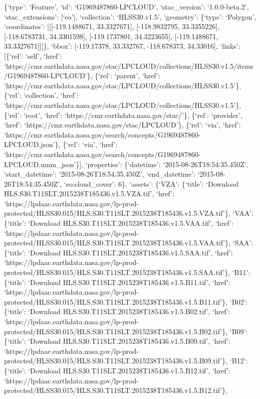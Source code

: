 \documentclass[
  letterpaper,
]{scrartcl}
\begin{document}
\{`type': `Feature', `id': `G1969487860-LPCLOUD', `stac\_version':
`1.0.0-beta.2', `stac\_extensions': {[}`eo'{]}, `collection':
`HLSS30.v1.5', `geometry': \{`type': `Polygon', `coordinates':
{[}{[}{[}-119.1488671, 33.3327671{]}, {[}-118.9832795, 33.3355226{]},
{[}-118.6783731, 34.3301598{]}, {[}-119.1737801, 34.3223655{]},
{[}-119.1488671, 33.3327671{]}{]}{]}\}, `bbox': {[}-119.17378,
33.332767, -118.678373, 34.33016{]}, `links': {[}\{`rel': `self',
`href':
`https://cmr.earthdata.nasa.gov/stac/LPCLOUD/collections/HLSS30.v1.5/items/G1969487860-LPCLOUD'\},
\{`rel': `parent', `href':
`https://cmr.earthdata.nasa.gov/stac/LPCLOUD/collections/HLSS30.v1.5'\},
\{`rel': `collection', `href':
`https://cmr.earthdata.nasa.gov/stac/LPCLOUD/collections/HLSS30.v1.5'\},
\{`rel': `root', `href': `https://cmr.earthdata.nasa.gov/stac/'\},
\{`rel': `provider', `href':
`https://cmr.earthdata.nasa.gov/stac/LPCLOUD'\}, \{`rel': `via', `href':
`https://cmr.earthdata.nasa.gov/search/concepts/G1969487860-LPCLOUD.json'\},
\{`rel': `via', `href':
`https://cmr.earthdata.nasa.gov/search/concepts/G1969487860-LPCLOUD.umm\_json'\}{]},
`properties': \{`datetime': `2015-08-26T18:54:35.450Z',
`start\_datetime': `2015-08-26T18:54:35.450Z', `end\_datetime':
`2015-08-26T18:54:35.450Z', `eo:cloud\_cover': 6\}, `assets': \{`VZA':
\{`title': `Download HLS.S30.T11SLT.2015238T185436.v1.5.VZA.tif',
`href':
`https://lpdaac.earthdata.nasa.gov/lp-prod-protected/HLSS30.015/HLS.S30.T11SLT.2015238T185436.v1.5.VZA.tif'\},
`VAA': \{`title': `Download HLS.S30.T11SLT.2015238T185436.v1.5.VAA.tif',
`href':
`https://lpdaac.earthdata.nasa.gov/lp-prod-protected/HLSS30.015/HLS.S30.T11SLT.2015238T185436.v1.5.VAA.tif'\},
`SAA': \{`title': `Download HLS.S30.T11SLT.2015238T185436.v1.5.SAA.tif',
`href':
`https://lpdaac.earthdata.nasa.gov/lp-prod-protected/HLSS30.015/HLS.S30.T11SLT.2015238T185436.v1.5.SAA.tif'\},
`B11': \{`title': `Download HLS.S30.T11SLT.2015238T185436.v1.5.B11.tif',
`href':
`https://lpdaac.earthdata.nasa.gov/lp-prod-protected/HLSS30.015/HLS.S30.T11SLT.2015238T185436.v1.5.B11.tif'\},
`B02': \{`title': `Download HLS.S30.T11SLT.2015238T185436.v1.5.B02.tif',
`href':
`https://lpdaac.earthdata.nasa.gov/lp-prod-protected/HLSS30.015/HLS.S30.T11SLT.2015238T185436.v1.5.B02.tif'\},
`B09': \{`title': `Download HLS.S30.T11SLT.2015238T185436.v1.5.B09.tif',
`href':
`https://lpdaac.earthdata.nasa.gov/lp-prod-protected/HLSS30.015/HLS.S30.T11SLT.2015238T185436.v1.5.B09.tif'\},
`B12': \{`title': `Download HLS.S30.T11SLT.2015238T185436.v1.5.B12.tif',
`href':
`https://lpdaac.earthdata.nasa.gov/lp-prod-protected/HLSS30.015/HLS.S30.T11SLT.2015238T185436.v1.5.B12.tif'\},
\end{document}
